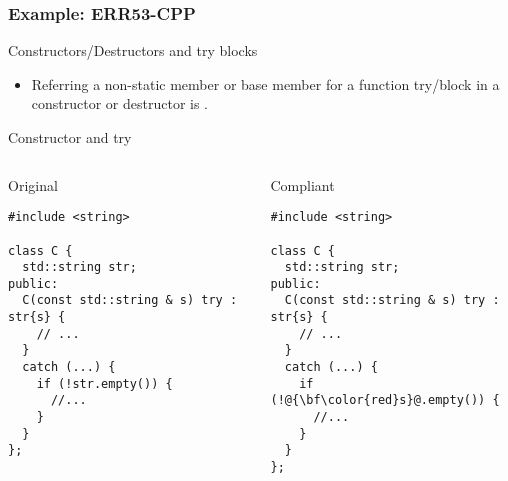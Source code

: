 \subsubsection{Example: ERR53-CPP}

\begin{frame}[t]{Constructors/Destructors and try blocks}
\begin{itemize}
  \item Referring a non-static member or base member for a function try/block 
        in a constructor or destructor is .
\end{itemize}
\end{frame}

\begin{frame}[t,fragile]{Constructor and try}
\begin{columns}

\begin{block}{Original}
\begin{lstlisting}
#include <string>

class C {
  std::string str;
public:
  C(const std::string & s) try : str{s} {
    // ...
  }
  catch (...) {
    if (!str.empty()) {
      //...
    }
  }
};
\end{lstlisting}
\end{block}

\pause
{}
\begin{block}{Compliant}
\begin{lstlisting}[escapechar=@]
#include <string>

class C {
  std::string str;
public:
  C(const std::string & s) try : str{s} {
    // ...
  }
  catch (...) {
    if (!@{\bf\color{red}s}@.empty()) {
      //...
    }
  }
};
\end{lstlisting}
\end{block}

\end{columns}
\end{frame}

